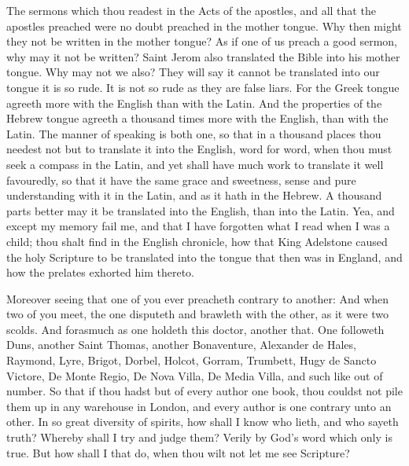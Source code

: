 The sermons which thou readest in the Acts 
of the apostles, and all that the apostles preached 
were no doubt preached in the mother tongue. 
Why then might they not be written in the 
mother tongue? As if one of us preach a good 
sermon, why may it not be written? Saint 
Jerom also translated the Bible into his mother 
tongue. Why may not we also? They will say 
it cannot be translated into our tongue it is so 
rude. It is not so rude as they are false liars.
For the Greek tongue agreeth more with the 
English than with the Latin. And the properties 
of the Hebrew tongue agreeth a thousand times 
more with the English, than with the Latin. The 
manner of speaking is both one, so that in a 
thousand places thou needest not but to translate 
it into the English, word for word, when thou 
must seek a compass in the Latin, and yet shall
have much work to translate it well favouredly, 
so that it have the same grace and sweetness,
sense and pure understanding with it in the 
Latin, and as it hath in the Hebrew. A thousand
parts better may it be translated into the 
English, than into the Latin. Yea, and except 
my memory fail me, and that I have forgotten 
what I read when I was a child; thou shalt find in 
the English chronicle, how that King Adelstone
caused the holy Scripture to be translated into
the tongue that then was in England, and how 
the prelates exhorted him thereto. 

Moreover seeing that one of you ever preacheth 
contrary to another: And when two of you 
meet, the one disputeth and brawleth with the 
other, as it were two scolds. And forasmuch 
as one holdeth this doctor, another that. One 
followeth Duns, another Saint Thomas, another
Bonaventure, Alexander de Hales, Raymond, 
Lyre, Brigot, Dorbel, Holcot, Gorram, Trumbett,
Hugy de Sancto Victore, De Monte Regio, 
De Nova Villa, De Media Villa, and such like out 
of number. So that if thou hadst but of every 
author one book, thou couldst not pile them up 
in any warehouse in London, and every author 
is one contrary unto an other. In so great diversity
of spirits, how shall I know who lieth, and 
who sayeth truth? Whereby shall I try and 
judge them? Verily by God's word which 
only is true. But how shall I that do, when thou 
wilt not let me see Scripture? 

